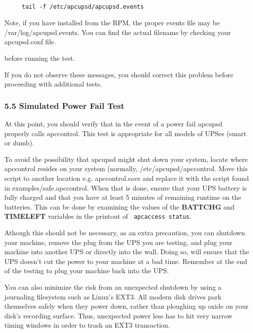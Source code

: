 {{\footnotesize
\begin{verbatim}
     
     tail -f /etc/apcupsd/apcupsd.events
\end{verbatim}
\normalsize

Note, if you have installed from the RPM, the proper events file may be
/var/log/apcupsd.events. You can find the actual filename by checking your
apcupsd.conf file.  

before running the test.  

If you do not observe these messages, you should correct this problem before
proceeding with additional tests. 

\label{Simulated-Power-Fail-Test}

\subsubsection*{5.5 Simulated Power Fail Test}

\label{index-Testing_002c-Simulate-Power-Fail-93}
\label{index-Simulate-Power-Fail-Test-94}
At this point, you should verify that in the event of a power fail apcupsd
properly calls apccontrol. This test is appropriate for all models of UPSes
(smart or dumb).  

To avoid the possibility that apcupsd might shut down your system, locate
where apccontrol resides on your system (normally, /etc/apcupsd/apccontrol.
Move this script to another location e.g. apccontrol.save and replace it with
the script found in examples/safe.apccontrol. When that is done, ensure that
your UPS battery is fully charged and that you have at least 5 minutes of
remaining runtime on the batteries. This can be done by examining the values
of the {\bf BATTCHG} and {\bf TIMELEFT} variables in the printout of {\tt
apcaccess status}.  

Athough this should not be necessary, as an extra precaution, you can shutdown
your machine, remove the plug from the UPS you are testing, and plug your
machine into another UPS or directly into the wall. Doing so, will ensure that
the UPS doesn't cut the power to your machine at a bad time. Remember at the
end of the testing to plug your machine back into the UPS.  

You can also minimize the risk from an unexpected shutdown by using a
journaling filesystem such as Linux's EXT3.  All modern disk drives park
themselves safely when they power down, rather than ploughing up oxide on your
disk's recording surface.  Thus, unexpected power less has to hit very narrow
timing windows in order to trash an EXT3 transaction.  

}}
